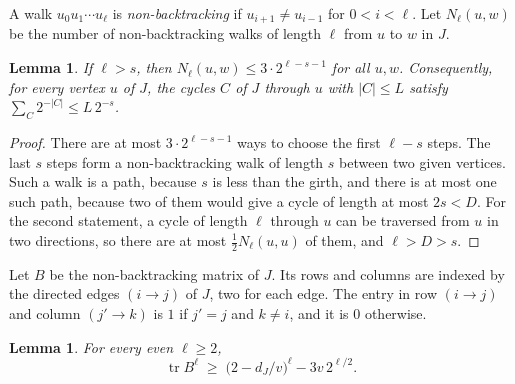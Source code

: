\documentclass[11pt]{article}
\newtheorem{lemma}[theorem]{Lemma}
\theoremstyle{definition}
\theoremstyle{remark}
\newcommand{\tr}{\operatorname{tr}}
\newcommand{\half}{\tfrac12}
\numberwithin{equation}{section}
\begin{document}
A walk $u_0u_1\cdots u_\ell$ is \emph{non-backtracking} if $u_{i+1}\ne u_{i-1}$ for $0<i<\ell$. Let
$N_\ell(u,w)$ be the number of non-backtracking walks of length $\ell$ from $u$ to $w$ in $J$.

\begin{lemma}\label{lem:walks}
If $\ell>s$, then $N_\ell(u,w)\le3\cdot2^{\ell-s-1}$ for all $u,w$. Consequently, for every vertex
$u$ of $J$, the cycles $C$ of $J$ through $u$ with $|C|\le L$ satisfy $\sum_C2^{-|C|}\le L\,2^{-s}$.
\end{lemma}

\begin{proof}
There are at most $3\cdot2^{\ell-s-1}$ ways to choose the first $\ell-s$ steps. The last $s$ steps
form a non-backtracking walk of length $s$ between two given vertices. Such a walk is a path,
because $s$ is less than the girth, and there is at most one such path, because two of them would
give a cycle of length at most $2s<D$. For the second statement, a cycle of length $\ell$ through $u$
can be traversed from $u$ in two directions, so there are at most $\half N_\ell(u,u)$ of them, and
$\ell>D>s$.
\end{proof}

Let $B$ be the non-backtracking matrix of $J$. Its rows and columns are indexed by the directed
edges $(i\to j)$ of $J$, two for each edge. The entry in row $(i\to j)$ and column $(j'\to k)$ is
$1$ if $j'=j$ and $k\ne i$, and it is $0$ otherwise.

\begin{lemma}\label{lem:spectrum}
For every even $\ell\ge2$,
\[
  \tr B^{\ell}\;\ge\;\bigl(2-d_J/v\bigr)^{\ell}-3v\,2^{\ell/2}.
\]
\end{lemma}
\end{document}
